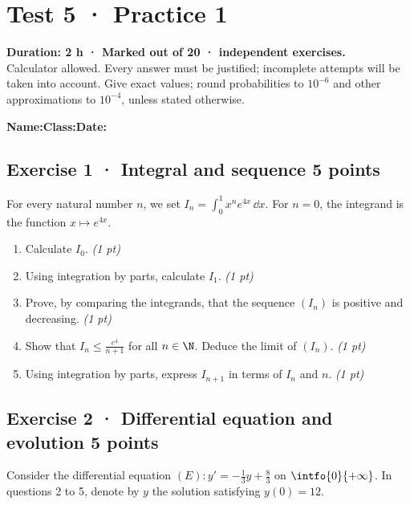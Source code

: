 \mxnewpage{}\label{sujet:7-1}

\section*{Test 5 · Practice 1}


\textbf{Duration: 2 h · Marked out of 20 ·  independent exercises.}\\Calculator allowed. Every answer must be justified; incomplete attempts will be taken into account. Give exact values; round probabilities to $10^{-6}$ and other approximations to $10^{-4}$, unless stated otherwise.

\smallskip\textbf{Name:}\enspace\dotfill\quad\textbf{Class:}\enspace\dotfill\quad\textbf{Date:}\enspace\dotfill

\subsection*{Exercise 1 · Integral and sequence \hfill 5 points}For every natural number $n$, we set $I_n=\displaystyle\int_0^1x^ne^{4x}\,\dd x$. For $n=0$, the integrand is the function $x\mapsto e^{4x}$.

\begin{enumerate}

\item Calculate $I_0$. \hfill\textit{(1 pt)}

\item Using integration by parts, calculate $I_1$. \hfill\textit{(1 pt)}

\item Prove, by comparing the integrands, that the sequence $(I_n)$ is positive and decreasing. \hfill\textit{(1 pt)}

\item Show that $I_n\le\frac{e^{4}}{n+1}$ for all $n\in\N$. Deduce the limit of $(I_n)$. \hfill\textit{(1 pt)}

\item Using integration by parts, express $I_{n+1}$ in terms of $I_n$ and $n$. \hfill\textit{(1 pt)}

\end{enumerate}

\subsection*{Exercise 2 · Differential equation and evolution \hfill 5 points}Consider the differential equation $(E):y'=-\frac1{3}y+\frac{8}{3}$ on $\intfo{0}{+\infty}$. In questions 2 to 5, denote by $y$ the solution satisfying $y(0)=12$.

